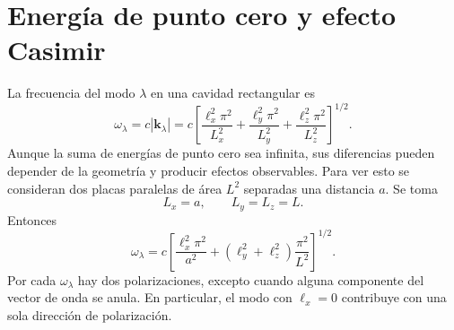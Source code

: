 \documentclass[11pt]{article}
\newcommand{\vb}[1]{\mathbf{#1}}
\begin{document}
\section{Energ\'ia de punto cero y efecto Casimir}

La frecuencia del modo $\lambda$ en una cavidad rectangular es
\begin{equation}
  \omega_\lambda
  =
  c|\vb k_\lambda|
  =
  c
  \left[
  \frac{\ell_x^2\pi^2}{L_x^2}
  +
  \frac{\ell_y^2\pi^2}{L_y^2}
  +
  \frac{\ell_z^2\pi^2}{L_z^2}
  \right]^{1/2}.
\end{equation}
Aunque la suma de energ\'ias de punto cero sea infinita, sus diferencias
pueden depender de la geometr\'ia y producir efectos observables. Para ver
esto se consideran dos placas paralelas de \'area $L^2$ separadas una
distancia $a$. Se toma
\begin{equation}
  L_x=a,
  \qquad
  L_y=L_z=L.
\end{equation}
Entonces
\begin{equation}
  \omega_\lambda
  =
  c
  \left[
  \frac{\ell_x^2\pi^2}{a^2}
  +
  (\ell_y^2+\ell_z^2)\frac{\pi^2}{L^2}
  \right]^{1/2}.
\end{equation}
Por cada $\omega_\lambda$ hay dos polarizaciones, excepto cuando alguna
componente del vector de onda se anula. En particular, el modo con
$\ell_x=0$ contribuye con una sola direcci\'on de polarizaci\'on.
\end{document}

